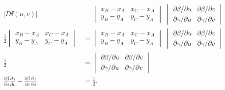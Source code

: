 \documentclass[10pt]{article}
\newcommand{\ve}[1]{\mathbf{#1}}
\begin{document}
  \begin{align*}
    | D\ve{f}(u,v) |
    &= \begin{vmatrix}
      x_B - x_A & x_C - x_A \\
      y_B - y_A & y_C - y_A 
    \end{vmatrix}\ 
    \begin{vmatrix}
      \partial \beta / \partial u & \partial \beta / \partial v \\
      \partial \gamma / \partial u & \partial \gamma / \partial v
    \end{vmatrix} \\
    \frac{1}{2} \begin{vmatrix}
      x_B - x_A & x_C - x_A \\
      y_B - y_A & y_C - y_A 
    \end{vmatrix}
    &= \begin{vmatrix}
      x_B - x_A & x_C - x_A \\
      y_B - y_A & y_C - y_A 
    \end{vmatrix}\ 
    \begin{vmatrix}
      \partial \beta / \partial u & \partial \beta / \partial v \\
      \partial \gamma / \partial u & \partial \gamma / \partial v
    \end{vmatrix} \\
    \frac{1}{2}
    &= \begin{vmatrix}
      \partial \beta / \partial u & \partial \beta / \partial v \\
      \partial \gamma / \partial u & \partial \gamma / \partial v
    \end{vmatrix} \\
    \frac{\partial \beta}{\partial u} \frac{\partial \gamma}{\partial v}
    - \frac{\partial \beta}{\partial v} \frac{\partial \gamma}{\partial u}
    &= \frac{1}{2}.
  \end{align*}
\end{document}
